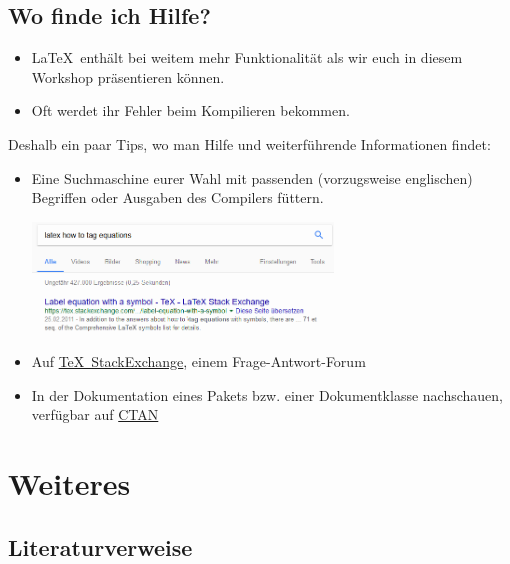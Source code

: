 \documentclass[german,10pt]{f1rstlady/templates/presentation}
\begin{document}
\subsection{Wo finde ich Hilfe?}

\begin{frame}{\subsecname}
\begin{itemize}
    \item \LaTeX\ enthält bei weitem mehr Funktionalität als wir euch in diesem Workshop präsentieren
        können.
    \item Oft werdet ihr Fehler beim Kompilieren bekommen.
\end{itemize}
Deshalb ein paar Tips, wo man Hilfe und weiterführende Informationen findet:
\begin{itemize}
    \item Eine \alert{Suchmaschine} eurer Wahl mit passenden (vorzugsweise englischen) Begriffen
        oder Ausgaben des Compilers füttern.
        \begin{center}
            \includegraphics[keepaspectratio,width=8cm]{images/google.png}
        \end{center}
    \item Auf \href{https://tex.stackexchange.com}{\alert{\TeX~StackExchange}}, einem
        Frage-Antwort-Forum
    \item In der \alert{Dokumentation} eines Pakets bzw. einer Dokumentklasse nachschauen, verfügbar
        auf \href{https://ctan.org}{CTAN}
\end{itemize}
\end{frame}

\section{Weiteres}

\subsection{Literaturverweise}
\end{document}
